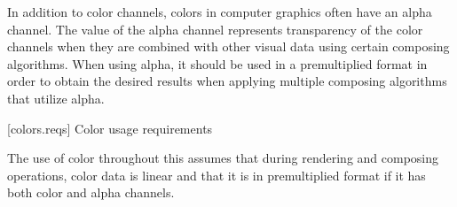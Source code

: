 \pnum
In addition to color channels, colors in computer graphics often have an alpha channel. The value of the alpha channel represents transparency of the color channels when they are combined with other visual data using certain composing algorithms. When using alpha, it should be used in a premultiplied format in order to obtain the desired results when applying multiple composing algorithms that utilize alpha.

 [colors.reqs] {Color usage requirements}

\pnum
The use of color throughout this \documenttypename assumes that during rendering and composing operations, color data is linear and that it is in premultiplied format if it has both color and alpha channels.

\addtocounter{SectionDepthBase}{1}

\addtocounter{SectionDepthBase}{-1}
